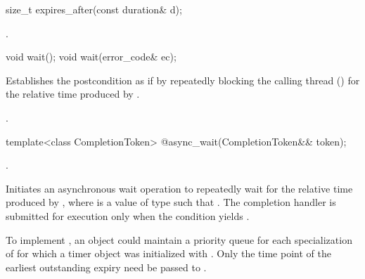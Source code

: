 %
\begin{itemdecl}
size_t expires_after(const duration& d);
\end{itemdecl}

\begin{itemdescr}
\pnum
\returns {}.
\end{itemdescr}

%
\begin{itemdecl}
void wait();
void wait(error_code& ec);
\end{itemdecl}

\begin{itemdescr}
\pnum
\effects Establishes the postcondition as if by repeatedly blocking the calling thread () for the relative time produced by .

\pnum
\postconditions {}.
\end{itemdescr}

%
%
\begin{itemdecl}
template<class CompletionToken>
  @\DEDUCED@ async_wait(CompletionToken&& token);
\end{itemdecl}

\begin{itemdescr}
\pnum
\completionsig {}.

\pnum
\effects Initiates an asynchronous wait operation to repeatedly wait for the relative time produced by , where  is a value of type  such that . The completion handler is submitted for execution only when the condition  yields .

\pnum
\begin{note} To implement , an  object  could maintain a priority queue for each specialization of  for which a timer object was initialized with . Only the time point  of the earliest outstanding expiry need be passed to . \end{note}
\end{itemdescr}




